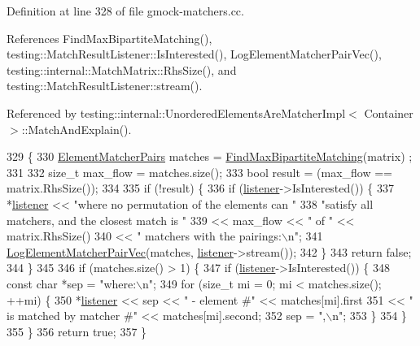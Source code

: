 Definition at line 328 of file gmock-\/matchers.\+cc.



References Find\+Max\+Bipartite\+Matching(), testing\+::\+Match\+Result\+Listener\+::\+Is\+Interested(), Log\+Element\+Matcher\+Pair\+Vec(), testing\+::internal\+::\+Match\+Matrix\+::\+Rhs\+Size(), and testing\+::\+Match\+Result\+Listener\+::stream().



Referenced by testing\+::internal\+::\+Unordered\+Elements\+Are\+Matcher\+Impl$<$ Container $>$\+::\+Match\+And\+Explain().


\begin{DoxyCode}
329                                                            \{
330   \hyperlink{namespacetesting_1_1internal_a0038618710c01a71150887dc7cfb0a29}{ElementMatcherPairs} matches = \hyperlink{namespacetesting_1_1internal_ae30bd8357c179334b2b09b0d689efccc}{FindMaxBipartiteMatching}(matrix)
      ;
331 
332   \textcolor{keywordtype}{size\_t} max\_flow = matches.size();
333   \textcolor{keywordtype}{bool} result = (max\_flow == matrix.RhsSize());
334 
335   \textcolor{keywordflow}{if} (!result) \{
336     \textcolor{keywordflow}{if} (\hyperlink{namespaceinteractive__marker_a0e579ab555212bb5e2c9f8a675b7618a}{listener}->IsInterested()) \{
337       *\hyperlink{namespaceinteractive__marker_a0e579ab555212bb5e2c9f8a675b7618a}{listener} << \textcolor{stringliteral}{"where no permutation of the elements can "}
338                    \textcolor{stringliteral}{"satisfy all matchers, and the closest match is "}
339                 << max\_flow << \textcolor{stringliteral}{" of "} << matrix.RhsSize()
340                 << \textcolor{stringliteral}{" matchers with the pairings:\(\backslash\)n"};
341       \hyperlink{namespacetesting_1_1internal_a7e3ffe5f66db16c3ab89de55eac65bfa}{LogElementMatcherPairVec}(matches, \hyperlink{namespaceinteractive__marker_a0e579ab555212bb5e2c9f8a675b7618a}{listener}->stream());
342     \}
343     \textcolor{keywordflow}{return} \textcolor{keyword}{false};
344   \}
345 
346   \textcolor{keywordflow}{if} (matches.size() > 1) \{
347     \textcolor{keywordflow}{if} (\hyperlink{namespaceinteractive__marker_a0e579ab555212bb5e2c9f8a675b7618a}{listener}->IsInterested()) \{
348       \textcolor{keyword}{const} \textcolor{keywordtype}{char} *sep = \textcolor{stringliteral}{"where:\(\backslash\)n"};
349       \textcolor{keywordflow}{for} (\textcolor{keywordtype}{size\_t} mi = 0; mi < matches.size(); ++mi) \{
350         *\hyperlink{namespaceinteractive__marker_a0e579ab555212bb5e2c9f8a675b7618a}{listener} << sep << \textcolor{stringliteral}{" - element #"} << matches[mi].first
351                   << \textcolor{stringliteral}{" is matched by matcher #"} << matches[mi].second;
352         sep = \textcolor{stringliteral}{",\(\backslash\)n"};
353       \}
354     \}
355   \}
356   \textcolor{keywordflow}{return} \textcolor{keyword}{true};
357 \}
\end{DoxyCode}

